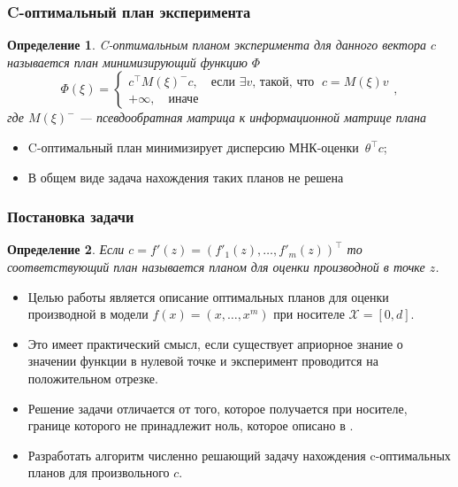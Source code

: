 \documentclass[unicode, notheorems, minimal, nologo]{beamer}
\newtheorem{definition}{Определение}
\begin{document}
\begin{frame}
	\frametitle{C-оптимальный план эксперимента}
	\begin{definition}
		C-оптимальным планом эксперимента для данного вектора $c$ называется план минимизирующий функцию $\Phi$
		\begin{equation*}
				\Phi(\xi) = \begin{cases}
				c^\top M(\xi)^{-} c, \quad \text{если } \exists v \text{, такой, что } \; c = M(\xi) v\\
				+\infty, \quad  \text{иначе}
		    \end{cases},
		\end{equation*}
		где $M(\xi)^{-}$ --- псевдообратная матрица к информационной матрице плана
	\end{definition}
	
	\begin{itemize}
		\item C-оптимальный план минимизирует дисперсию МНК-оценки~$\theta^\top c$;
		\item В общем виде задача нахождения таких планов не решена
	\end{itemize}
	
  
\end{frame}

\begin{frame}
	\frametitle{Постановка задачи}
	\begin{definition}
	Если $c = f'(z) = \left(f'_1(z), \ldots, f'_m(z) \right)^\top$ то соответствующий план называется планом для оценки производной в точке $z$.
	\end{definition}
	\begin{itemize}
		\item Целью работы является описание оптимальных планов для оценки производной в модели $f(x) = \left(x, \ldots, x^m \right)$ при носителе $\mathcal{X} = [0, d]$.
		\item Это имеет практический смысл, если существует априорное знание о значении функции в нулевой точке и эксперимент проводится на положительном отрезке.
		\item Решение задачи отличается от того, которое получается при носителе, границе которого не принадлежит ноль, которое описано в \citep{melasmain}.
		\item Разработать алгоритм численно решающий задачу нахождения c-оптимальных планов для произвольного $c$.
	\end{itemize}
	
\end{frame}
\end{document}
